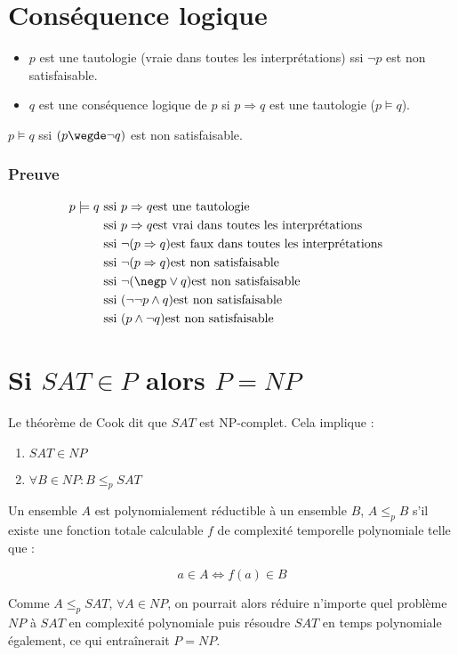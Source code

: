 \newpage
\section{Conséquence logique}

\begin{itemize}
\item $p$ est une tautologie (vraie dans toutes les interprétations) ssi $\neg p$ est non satisfaisable.
\item $q$ est une conséquence logique de $p$ si $p \Rightarrow q$ est une tautologie ($p \models q$).
\end{itemize}

$p \models q$ ssi $(p \wegde \neg q)$ est non satisfaisable.

\subsubsection*{Preuve}

\begin{align*}
p \models q\ &\text{ssi } p \Rightarrow q \text{est une tautologie}& \\
&\text{ssi } p \Rightarrow q \text{est vrai dans toutes les interprétations}& \\
&\text{ssi } \neg(p \Rightarrow q) \text{est faux dans toutes les interprétations}& \\
&\text{ssi } \neg(p \Rightarrow q) \text{est non satisfaisable}& \\
&\text{ssi } \neg(\negp \vee q) \text{est non satisfaisable}& \\
&\text{ssi } (\neg \neg p \wedge q) \text{est non satisfaisable}& \\
&\text{ssi } (p \wedge \neg q) \text{est non satisfaisable}& 
\end{align*}



\section[P = NP]{Si $SAT \in P$ alors $P = NP$}\label{dem:PNP}

Le théorème de Cook dit que $SAT$ est NP-complet. Cela implique :
\begin{enumerate}
\item $SAT \in NP$
\item $\forall B \in NP : B \leq_p SAT$
\end{enumerate}

Un ensemble $A$ est polynomialement réductible à un ensemble $B$, $A \leq_p B$ s'il existe une fonction totale calculable $f$ de complexité temporelle polynomiale telle que :

\begin{equation*}
a \in A \Leftrightarrow f(a) \in B
\end{equation*}

Comme $A \leq_p SAT$, $\forall A \in NP$, on pourrait alors réduire n'importe quel problème $NP$ à $SAT$ en complexité polynomiale puis résoudre $SAT$ en temps polynomiale également, ce qui entraînerait $P = NP$.

\label{lastpage}

